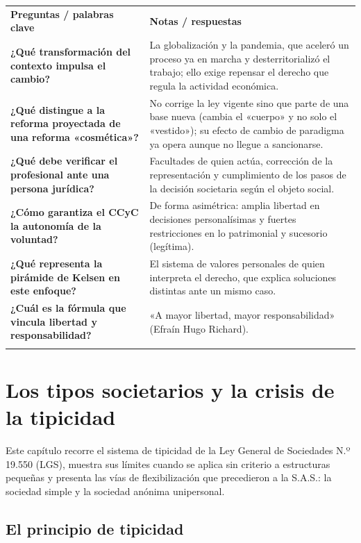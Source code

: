 \documentclass[12pt,oneside]{book}
\newcommand{\cq}[1]{\textbf{#1}}
\newcommand{\cornell}[3]{%
  \par\medskip\noindent\begingroup
  \renewcommand{\arraystretch}{1.25}%
  \begin{tabularx}{\textwidth}{|>{\raggedright\arraybackslash}p{0.27\textwidth}|>{\raggedright\arraybackslash}X|}
    \hline
    \multicolumn{2}{|>{\centering\arraybackslash}X|}{\cellcolor{azulacad!12}\textbf{Cuadro Cornell --- #1}}\\ \hline
    \cellcolor{gray!10}\textbf{Preguntas / palabras clave} & \cellcolor{gray!10}\textbf{Notas / respuestas} \\ \hline
    #2
    \multicolumn{2}{|>{\raggedright\arraybackslash}X|}{\cellcolor{azulacad!6}\textbf{Resumen.} #3}\\ \hline
  \end{tabularx}%
  \endgroup\par\medskip}
\begin{document}
\cornell{Un derecho societario en transformación}{
\cq{¿Qué transformación del contexto impulsa el cambio?} & La globalización y la pandemia, que aceleró un proceso ya en marcha y desterritorializó el trabajo; ello exige repensar el derecho que regula la actividad económica. \\ \hline
\cq{¿Qué distingue a la reforma proyectada de una reforma «cosmética»?} & No corrige la ley vigente sino que parte de una base nueva (cambia el «cuerpo» y no solo el «vestido»); su efecto de cambio de paradigma ya opera aunque no llegue a sancionarse. \\ \hline
\cq{¿Qué debe verificar el profesional ante una persona jurídica?} & Facultades de quien actúa, corrección de la representación y cumplimiento de los pasos de la decisión societaria según el objeto social. \\ \hline
\cq{¿Cómo garantiza el CCyC la autonomía de la voluntad?} & De forma asimétrica: amplia libertad en decisiones personalísimas y fuertes restricciones en lo patrimonial y sucesorio (legítima). \\ \hline
\cq{¿Qué representa la pirámide de Kelsen en este enfoque?} & El sistema de valores personales de quien interpreta el derecho, que explica soluciones distintas ante un mismo caso. \\ \hline
\cq{¿Cuál es la fórmula que vincula libertad y responsabilidad?} & «A mayor libertad, mayor responsabilidad» (Efraín Hugo Richard). \\ \hline
}{El contexto de transformación acelerada del trabajo impulsa un cambio de paradigma en el derecho societario. Ese cambio se apoya en la autonomía de la voluntad, cuyo contrapeso es la responsabilidad de quien elige su forma de organización.}

\chapter{Los tipos societarios y la crisis de la tipicidad}
\label{cap:tipos}

Este capítulo recorre el sistema de tipicidad de la Ley General de Sociedades N.º 19.550 (LGS), muestra sus límites cuando se aplica sin criterio a estructuras pequeñas y presenta las vías de flexibilización que precedieron a la S.A.S.: la sociedad simple y la sociedad anónima unipersonal.

\section{El principio de tipicidad}
\end{document}
